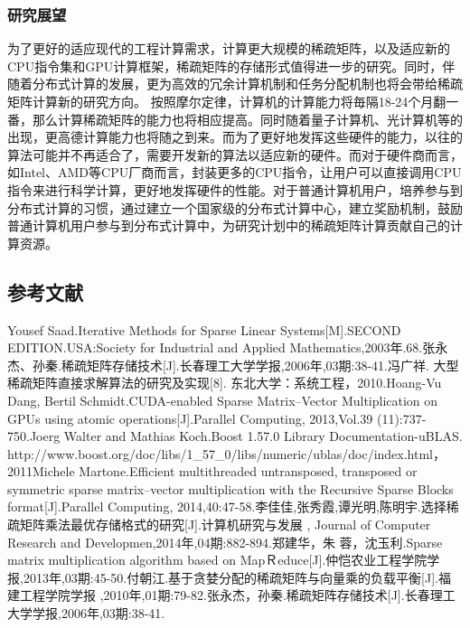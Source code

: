\documentclass{article}
\begin{document}
\subsubsection{研究展望}
为了更好的适应现代的工程计算需求，计算更大规模的稀疏矩阵，以及适应新的CPU指令集和GPU计算框架，稀疏矩阵的存储形式值得进一步的研究。同时，伴随着分布式计算的发展，更为高效的冗余计算机制和任务分配机制也将会带给稀疏矩阵计算新的研究方向。
按照摩尔定律，计算机的计算能力将毎隔18-24个月翻一番，那么计算稀疏矩阵的能力也将相应提高。同时随着量子计算机、光计算机等的出现，更高德计算能力也将随之到来。而为了更好地发挥这些硬件的能力，以往的算法可能并不再适合了，需要开发新的算法以适应新的硬件。而对于硬件商而言，如Intel、AMD等CPU厂商而言，封装更多的CPU指令，让用户可以直接调用CPU指令来进行科学计算，更好地发挥硬件的性能。对于普通计算机用户，培养参与到分布式计算的习惯，通过建立一个国家级的分布式计算中心，建立奖励机制，鼓励普通计算机用户参与到分布式计算中，为研究计划中的稀疏矩阵计算贡献自己的计算资源。\newline

\subsection{参考文献}
      \qquad
\newline
 [1]Yousef Saad.Iterative Methods for Sparse Linear Systems[M].SECOND EDITION.USA:Society for Industrial and Applied Mathematics,2003年.68.\newline
 [2]张永杰、孙秦.稀疏矩阵存储技术[J].长春理工大学学报,2006年,03期:38-41.\newline
 [3]冯广祥. 大型稀疏矩阵直接求解算法的研究及实现[8].  东北大学：系统工程，2010.\newline
    [4]Hoang-Vu Dang,  Bertil Schmidt.CUDA-enabled Sparse Matrix–Vector Multiplication on GPUs
using atomic operations[J].Parallel Computing, 2013,Vol.39 (11):737-750.\newline
 [5]Joerg Walter and Mathias Koch.Boost 1.57.0 Library Documentation-uBLAS. http://www.boost.org/doc/libs/1\_57\_0/libs/numeric/ublas/doc/index.html， 2011\newline
  [6]Michele Martone.Efficient multithreaded untransposed, transposed or symmetric sparse matrix–vector multiplication with the Recursive Sparse Blocks format[J].Parallel Computing, 2014,40:47-58.\newline
  [7]李佳佳,张秀霞,谭光明,陈明宇.选择稀疏矩阵乘法最优存储格式的研究[J].计算机研究与发展 , Journal of Computer Research and Developmen,2014年,04期:882-894.\newline
  [8]郑建华，朱 蓉，沈玉利.Sparse matrix multiplication algorithm based on MapＲeduce[J].仲恺农业工程学院学报,2013年,03期:45-50.\newline
[9]付朝江.基于贪婪分配的稀疏矩阵与向量乘的负载平衡[J].福建工程学院学报 ,2010年,01期:79-82.\newline
[10]张永杰，孙秦.稀疏矩阵存储技术[J].长春理工大学学报,2006年,03期:38-41.\newline
 
\end{document}
